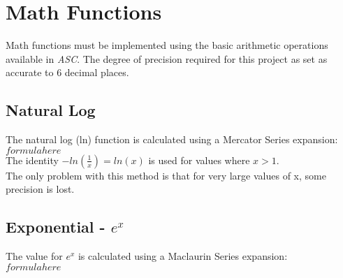 \documentclass{report}
\begin{document}
\section*{Math Functions}
Math functions must be implemented using the basic arithmetic operations available in \emph{ASC}. The degree of precision required for this project as set as accurate to 6 decimal places.
\subsection*{Natural Log}
The natural log (ln) function is calculated using a Mercator Series expansion:\\
$ formula here $ \\
The identity $ -ln(\frac{1}{x}) = ln(x)$ is used for values where $x > 1$.\\
The only problem with this method is that for very large values of x, some precision is lost. 

\subsection*{Exponential - $e^x$}
The value for $e^x$ is calculated using a Maclaurin Series expansion:\\
$ formula here $ \\
\end{document}
